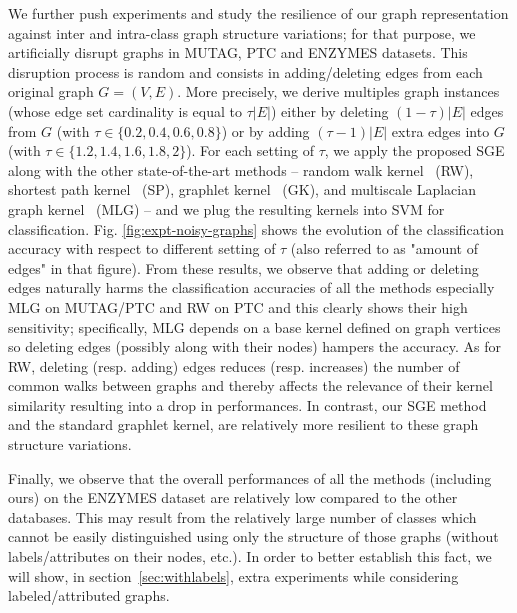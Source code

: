 \documentclass[journal]{IEEEtran}
\theoremstyle{definition}
\newcommand{\fig}[1]{Fig. \ref{#1}}
\begin{document}
We further push experiments and study the resilience of our graph representation against inter and intra-class graph structure variations; for that purpose, we artificially disrupt graphs in MUTAG, PTC and ENZYMES datasets. This disruption process is random and consists in adding/deleting edges from each original graph $G=(V,E)$. More precisely, we derive multiples graph instances (whose edge set cardinality is equal to $\tau \lvert E\rvert$) either by deleting $(1-\tau) \lvert E\rvert$ edges from $G$ (with $\tau \in \{0.2,0.4,0.6,0.8\}$) or by adding $(\tau-1)\lvert E\rvert$ extra edges into $G$ (with $\tau \in \{1.2,1.4,1.6,1.8,2\}$). For each setting of $\tau$, we apply the proposed SGE along with the other state-of-the-art methods -- random walk kernel~\cite{Vishwanathan2010} (RW), shortest path kernel~\cite{Borgwardt2005} (SP), graphlet kernel~\cite{Shervashidze2009} (GK), and multiscale Laplacian graph kernel~\cite{Kondor2016} (MLG) -- and we plug the resulting kernels into SVM for classification. \fig{fig:expt-noisy-graphs} shows the evolution of the classification accuracy with respect to different setting of $\tau$ (also referred to as "amount of edges" in that figure). From these results, we observe that adding or deleting edges naturally harms the classification accuracies of all the methods especially MLG on MUTAG/PTC and RW on PTC and this clearly shows their high sensitivity; specifically, MLG depends on a base kernel defined on graph vertices so deleting edges (possibly along with their nodes) hampers the accuracy. As for RW, deleting (resp. adding) edges reduces (resp. increases) the number of common walks between graphs and thereby affects the relevance of their kernel similarity resulting into a drop in performances. In contrast, our SGE method and the standard graphlet kernel, are relatively more resilient to these graph structure variations.

Finally, we observe that the overall performances of all the methods (including ours) on the ENZYMES dataset are relatively low compared to the other databases. This may result from the relatively large number of classes which cannot be easily distinguished using only the structure of those graphs (without labels/attributes on their nodes, etc.). In order to better establish this fact, we will show, in section~\ref{sec:withlabels}, extra experiments while considering labeled/attributed graphs.
\end{document}
